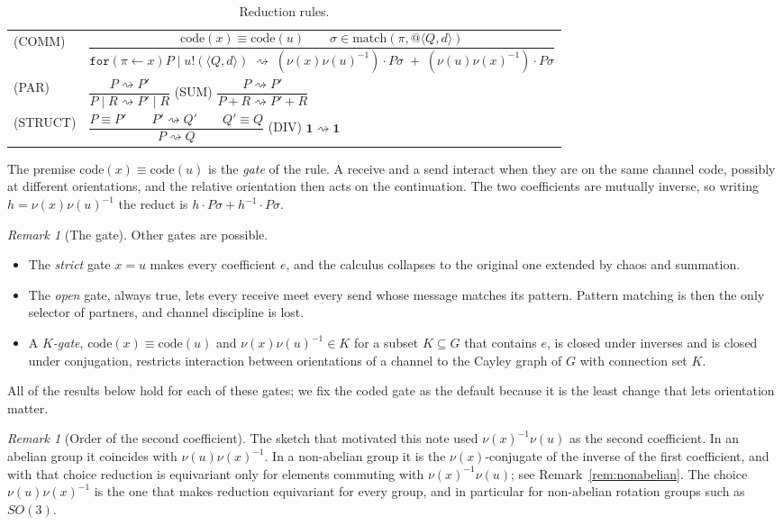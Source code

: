\documentclass[11pt]{article}
\makeatletter
\theoremstyle{definition}
\theoremstyle{remark}
\newtheorem{remark}[theorem]{Remark}
\newcommand{\chaos}{\mathbf{1}}
\newcommand{\rcv}[3]{\mathtt{for}(#1 \leftarrow #2)#3}
\newcommand{\out}[3]{#1!(\langle #2, #3\rangle)}
\newcommand{\qn}[2]{@\langle #1, #2\rangle}
\newcommand{\act}[2]{#1\cdot #2}
\newcommand{\red}{\rightsquigarrow}
\newcommand{\scong}{\equiv}
\newcommand{\code}{\mathrm{code}}
\newcommand{\match}{\mathrm{match}}
\makeatother
\begin{document}
\begin{table}[ht]
\centering
\renewcommand{\arraystretch}{1.6}
\begin{tabular}{@{}ll@{}}
\toprule
(COMM) & $\dfrac{\code(x)\scong\code(u) \qquad \sigma\in\match(\pi,\qn{Q}{d})}
  {\rcv{\pi}{x}{P}\mid\out{u}{Q}{d}\;\red\;
   \act{(\nu(x)\nu(u)^{-1})}{P\sigma} \;+\;
   \act{(\nu(u)\nu(x)^{-1})}{P\sigma}}$\\
(PAR) & $\dfrac{P\red P'}{P\mid R\red P'\mid R}$
\qquad (SUM) \; $\dfrac{P\red P'}{P+R\red P'+R}$\\
(STRUCT) & $\dfrac{P\scong P' \qquad P'\red Q' \qquad Q'\scong Q}{P\red Q}$
\qquad (DIV) \; $\chaos\red\chaos$\\
\bottomrule
\end{tabular}
\caption{Reduction rules.}
\label{tab:red}
\end{table}

The premise $\code(x)\scong\code(u)$ is the \emph{gate} of the rule. A receive
and a send interact when they are on the same channel code, possibly at
different orientations, and the relative orientation then acts on the
continuation. The two coefficients are mutually inverse, so writing
$h = \nu(x)\nu(u)^{-1}$ the reduct is $\act{h}{P\sigma}+\act{h^{-1}}{P\sigma}$.

\begin{remark}[The gate]\label{rem:gate}
Other gates are possible.
\begin{itemize}[leftmargin=1.5em]
\item The \emph{strict} gate $x = u$ makes every coefficient $e$, and the
  calculus collapses to the original one extended by chaos and summation.
\item The \emph{open} gate, always true, lets every receive meet every send
  whose message matches its pattern. Pattern matching is then the only
  selector of partners, and channel discipline is lost.
\item A \emph{$K$-gate}, $\code(x)\scong\code(u)$ and
  $\nu(x)\nu(u)^{-1}\in K$ for a subset $K\subseteq G$ that contains $e$,
  is closed under inverses and is closed under conjugation, restricts
  interaction between orientations of a channel to the Cayley graph of $G$
  with connection set $K$.
\end{itemize}
All of the results below hold for each of these gates; we fix the coded gate
as the default because it is the least change that lets orientation matter.
\end{remark}

\begin{remark}[Order of the second coefficient]\label{rem:order}
The sketch that motivated this note used $\nu(x)^{-1}\nu(u)$ as the second
coefficient. In an abelian group it coincides with $\nu(u)\nu(x)^{-1}$. In a
non-abelian group it is the $\nu(x)$-conjugate of the inverse of the first
coefficient, and with that choice reduction is equivariant only for elements
commuting with $\nu(x)^{-1}\nu(u)$; see Remark~\ref{rem:nonabelian}. The choice
$\nu(u)\nu(x)^{-1}$ is the one that makes reduction equivariant for every
group, and in particular for non-abelian rotation groups such as $SO(3)$.
\end{remark}
\end{document}
